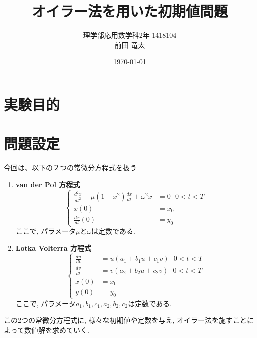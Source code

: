 \documentclass[12pt,a4paper]{jsarticle}
\begin{document}
\begin{titlepage}
\title{オイラー法を用いた初期値問題}
\author{理学部応用数学科2年 $$1418104 \\前田 竜太}
\date{\today}
\maketitle
\end{titlepage}

\section{実験目的}

\section{問題設定}
今回は、以下の２つの常微分方程式を扱う
\begin{enumerate}
	\item \textbf{van der Pol 方程式}
		\begin{equation*}
		\left\{
		\begin{aligned}
		\frac{d^{2} x}{dt^{2}} - \mu(1 - x^{2})\frac{dx}{dt} + \omega^{2} x &= 0 ~~~ 0 < t < T\\
		x(0) &= x_0 \\
		\frac{dx}{dt}(0) &= y_0
		\end{aligned}
		\right.
		\end{equation*}
		ここで, パラメータ$\mu$と$\omega$は定数である.
	\item \textbf{Lotka Volterra 方程式}
		\begin{equation*}
		\left\{
		\begin{aligned}
		\frac{du}{dt} &= u(a_1 + b_1u + c_1v) ~~~ 0 < t < T \\
		\frac{dv}{dt} &= v(a_2 + b_2u + c_2v) ~~~ 0 < t < T \\
		x(0) &= x_0 \\ 
		y(0) &= y_0
		\end{aligned}
		\right.
		\end{equation*}
		ここで, パラメータ$a_1, b_1, c_1, a_2, b_2, c_2$は定数である. 
\end{enumerate}
この2つの常微分方程式に, 様々な初期値や定数を与え, オイラー法を施すことによって数値解を求めていく.
\end{document}
